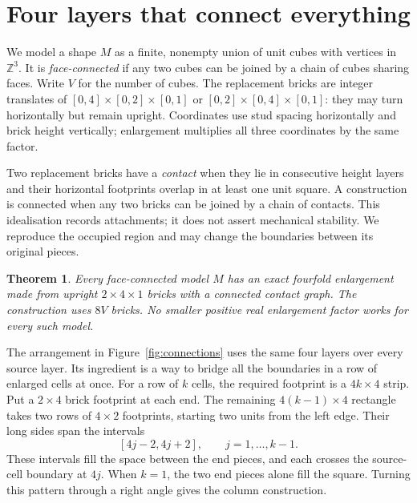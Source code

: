 \documentclass[10pt,reqno]{amsart}
\newtheorem{theorem}{Theorem}
\begin{document}
\section{Four layers that connect everything}

We model a shape $M$ as a finite, nonempty union of unit cubes with
vertices in $\mathbb Z^3$. It is \emph{face-connected} if any two cubes
can be joined by a chain of cubes sharing faces. Write $V$ for the
number of cubes. The replacement bricks are integer translates of
$[0,4]\times[0,2]\times[0,1]$ or
$[0,2]\times[0,4]\times[0,1]$: they may turn horizontally but remain
upright. Coordinates use stud spacing horizontally and brick height
vertically; enlargement multiplies all three coordinates by the same factor.

Two replacement bricks have a \emph{contact} when they lie in consecutive
height layers and their horizontal footprints overlap in at least one
unit square. A construction is connected when any two bricks can be
joined by a chain of contacts. This idealisation records attachments;
it does not assert mechanical stability. We reproduce the occupied
region and may change the boundaries between its original pieces.

\begin{theorem}\label{thm:fourfold}
Every face-connected model $M$ has an exact fourfold enlargement made
from upright $2\times4\times1$ bricks with a connected contact graph.
The construction uses $8V$ bricks. No smaller positive real enlargement
factor works for every such model.
\end{theorem}

The arrangement in Figure~\ref{fig:connections} uses the same four
layers over every source layer. Its ingredient is a way to bridge all
the boundaries in a row of enlarged cells at once. For a row of $k$
cells, the required footprint is a $4k\times4$ strip. Put a
$2\times4$ brick footprint at each end. The remaining $4(k-1)\times4$
rectangle takes two rows of $4\times2$ footprints, starting two units
from the left edge. Their long sides span the intervals
\[
 [4j-2,4j+2],\qquad j=1,\ldots,k-1.
\]
These intervals fill the space between the end pieces, and each crosses
the source-cell boundary at $4j$. When $k=1$, the two end pieces alone
fill the square. Turning this pattern through a right angle gives the
column construction.
\end{document}
